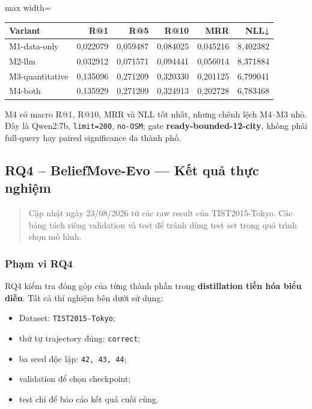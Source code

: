 \begin{table}[!htbp]
\centering
\scriptsize
\setlength{\tabcolsep}{2.5pt}
\begin{adjustbox}{max width=\textwidth}
\begin{tabular}{@{}lrrrrr@{}}
\toprule
Variant & R@1 & R@5 & R@10 & MRR & NLL↓ \\
\midrule
M1-data-only & 0,022079 & 0,059487 & 0,084025 & 0,045216 & 8,402382 \\
M2-llm & 0,032912 & 0,071571 & 0,094441 & 0,056014 & 8,371884 \\
M3-quantitative & 0,135096 & 0,271209 & 0,320330 & 0,201125 & 6,799041 \\
M4-both & 0,135929 & 0,271209 & 0,324913 & 0,202728 & 6,783468 \\
\bottomrule
\end{tabular}
\end{adjustbox}
\end{table}

M4 có macro R@1, R@10, MRR và NLL tốt nhất, nhưng chênh lệch M4--M3 nhỏ. Đây là Qwen2:7b, \texttt{limit=200}, \texttt{no-OSM}; gate \textbf{ready-bounded-12-city}, không phải full-query hay paired significance đa thành phố.


\subsection{RQ4 -- BeliefMove-Evo --- Kết quả thực nghiệm}

\begin{quote}\small Cập nhật ngày 23/08/2026 từ các raw result của TIST2015-Tokyo. Các bảng tách riêng validation và test để tránh dùng test set trong quá trình chọn mô hình.\end{quote}
\subsubsection*{Phạm vi RQ4}

RQ4 kiểm tra đóng góp của từng thành phần trong \textbf{distillation tiến hóa biểu diễn}. Tất cả thí nghiệm bên dưới sử dụng:

\begin{itemize}
\item Dataset: \texttt{TIST2015-Tokyo};
\item thứ tự trajectory đúng: \texttt{correct};
\item ba seed độc lập: \texttt{42, 43, 44};
\item validation để chọn checkpoint;
\item test chỉ để báo cáo kết quả cuối cùng.
\end{itemize}

